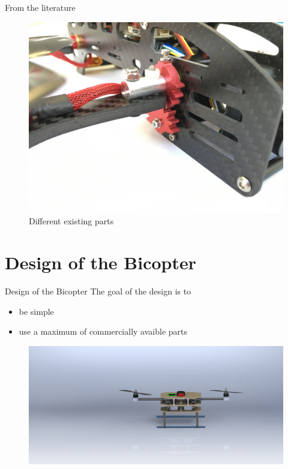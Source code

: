 \documentclass{beamer}
\begin{document}
\begin{frame}{From the literature}
\begin{figure}
\includegraphics[scale=0.11]{pictures/bicopter3}
\caption{Different existing parts}
\end{figure}
\end{frame}

\section{Design of the Bicopter}
\begin{frame}{Design of the Bicopter}
The goal of the design is to
\begin{itemize}
\item be simple
\item use a maximum of commercially avaible parts
\end{itemize}
\begin{figure}
\includegraphics[scale=0.07]{pictures/picture4}
\end{figure}
\end{frame}
\end{document}

